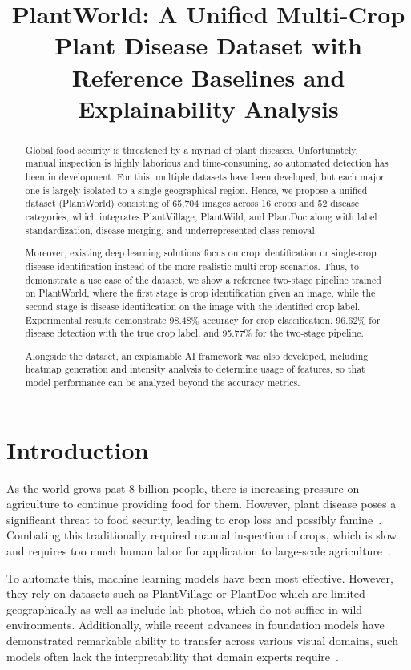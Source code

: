 \documentclass{bmvc2k}
\title{PlantWorld: A Unified Multi-Crop Plant Disease Dataset with Reference Baselines and Explainability Analysis}
\begin{document}
\maketitle

\begin{abstract}
Global food security is threatened by a myriad of plant diseases. Unfortunately, manual inspection is highly laborious and time-consuming, so automated detection has been in development. For this, multiple datasets have been developed, but each major one is largely isolated to a single geographical region. Hence, we propose a unified dataset (PlantWorld) consisting of 65,704 images across 16 crops and 52 disease categories, which integrates PlantVillage, PlantWild, and PlantDoc along with label standardization, disease merging, and underrepresented class removal.

Moreover, existing deep learning solutions focus on crop identification or single-crop disease identification instead of the more realistic multi-crop scenarios. Thus, to demonstrate a use case of the dataset, we show a reference two-stage pipeline trained on PlantWorld, where the first stage is crop identification given an image, while the second stage is disease identification on the image with the identified crop label. Experimental results demonstrate 98.48\% accuracy for crop classification, 96.62\% for disease detection with the true crop label, and 95.77\% for the two-stage pipeline.

Alongside the dataset, an explainable AI framework was also developed, including heatmap generation and intensity analysis to determine usage of features, so that model performance can be analyzed beyond the accuracy metrics.
\end{abstract}

\section{Introduction}
\label{sec:intro}
As the world grows past 8 billion people, there is increasing pressure on agriculture to continue providing food for them. However, plant disease poses a significant threat to food security, leading to crop loss and possibly famine~\cite{ristaino2021persistent}. Combating this traditionally required manual inspection of crops, which is slow and requires too much human labor for application to large-scale agriculture~\cite{li2021}.

To automate this, machine learning models have been most effective. However, they rely on datasets such as PlantVillage or PlantDoc which are limited geographically as well as include lab photos, which do not suffice in wild environments. Additionally, while recent advances in foundation models have demonstrated remarkable ability to transfer across various visual domains, such models often lack the interpretability that domain experts require~\cite{pal2025lightweight}.
\end{document}
